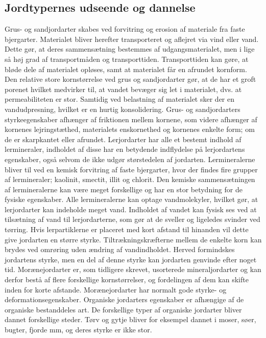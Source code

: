 \subsection{Jordtypernes udseende og dannelse}
Grus-  og sandjordarter skabes ved forvitring og erosion af materiale fra faste bjergarter. Materialet bliver herefter transporteret og aflejret via vind eller vand. Dette gør, at deres sammensætning bestemmes af udgangsmaterialet, men i lige så høj grad af transportmåden og transporttiden. Transporttiden kan gøre, at bløde dele af materialet opløses, samt at materialet får en afrundet kornform. Den relative store kornstørrelse ved grus og sandjordarter gør, at de har et groft porenet hvilket medvirker til, at vandet bevæger sig let i materialet,  dvs. at permeabiliteten er stor. Samtidig ved belastning af materialet sker der en vandudpresning, hvilket er en hurtig konsolidering.
\newline \indent{     }  Grus- og sandjordarters styrkeegenskaber afhænger af friktionen mellem kornene, som videre afhænger af kornenes lejringstæthed, materialets enskornethed og kornenes enkelte form; om de er skarpkantet eller afrundet. 
\newline \indent{     }  Lerjordarter har alle et bestemt indhold af lermineraler, indholdet af disse har en betydende indflydelse på lerjordartens egenskaber, også selvom de ikke udgør størstedelen af jordarten. Lermineralerne bliver til ved en kemisk forvitring af faste bjergarter, hvor der findes fire grupper af lermineraler; kaolinit, smectit, illit og chlorit. Den kemiske sammensætningen af lermineralerne kan være meget forskellige og har en stor betydning for de fysiske egenskaber. Alle lermineralerne kan optage vandmolekyler, hvilket gør, at lerjordarter kan indeholde meget vand. Indholdet af vandet kan fysisk ses ved at tilsætning af vand til lerjordarterne, som gør at de sveller og ligeledes svinder ved tørring. Hvis lerpartiklerne er placeret med kort afstand til hinanden vil dette give jordarten en større styrke.  Tiltrækningskræfterne mellem de enkelte korn kan brydes ved omrøring uden ændring af vandindholdet. Herved formindskes jordartens styrke, men en del af denne styrke kan jordarten genvinde efter noget tid. 
\newline \indent{     }  Morænejordarter er, som tidligere skrevet, usorterede mineraljordarter og kan derfor bestå af flere forskellige kornstørrelser, og fordelingen af dem kan skifte inden for korte afstande. Morænejordarter har normalt gode styrke- og deformationsegenskaber. 
\newline \indent{     }  Organiske jordarters egenskaber er afhængige af de organiske bestanddeles art. De forskellige typer af organiske jordarter bliver dannet forskellige steder. Tørv og gytje bliver for eksempel dannet i moser, søer, bugter, fjorde mm, og deres styrke er ikke stor. 

